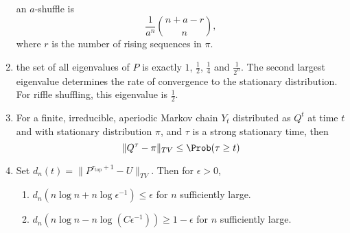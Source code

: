 \documentclass[12pt]{article}
\begin{document}
\begin{enumerate}
        an \( a \)-shuffle is
        \[
            \frac{1}{a^n} \binom{n + a - r}{n},
        \] where \( r \) is the number of rising sequences in \( \pi \).
    \item
        the set of all eigenvalues of \( P \) is exactly \( 1 \), \(
        \frac{1}{2} \), \( \frac{1}{4} \) and \( \frac{1}{2^n} \).  The
        second largest eigenvalue determines the rate of convergence to
        the stationary distribution. For riffle shuffling, this
        eigenvalue is \( \frac{1}{2} \).
    \item
        For a finite, irreducible, aperiodic Markov chain \( Y_t \)
        distributed as \( Q^t \) at time \( t \) and with stationary
        distribution \( \pi \), and \( \tau \) is a strong stationary
        time, then
        \[
            \| Q^{\tau} - \pi \|_{TV} \le \Prob(\tau \ge t)
        \]
    \item
        Set \( d_n(t) = \| P^{\tau_{\text{top}}+1} - U \|_{TV} \).  Then
        for \( \epsilon > 0 \),
        \begin{enumerate}
            \item
                \( d_{n}(n \log n + n \log \epsilon^{-1} )\le \epsilon \)
                for \( n \) sufficiently large.
            \item
                \( d_{n}(n \log n - n \log (C \epsilon^{-1})) \ge 1-\epsilon
                \) for \( n \) sufficiently large.
        \end{enumerate}
\end{enumerate}

\hr

\end{document}
